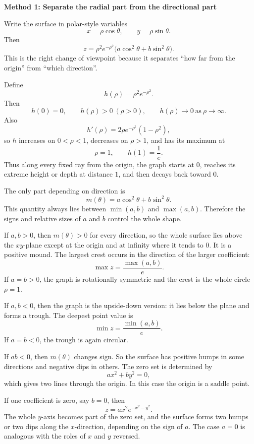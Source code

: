 \documentclass[a4paper,12pt,twocolumn]{article}
\newenvironment{solutionbox}{\begin{framed}}{\end{framed}}
\begin{document}
\begin{solutionbox}
\textbf{Method 1: Separate the radial part from the directional part}

\begin{steps}
\item Write the surface in polar-style variables
\[
x=\rho\cos\theta,\qquad y=\rho\sin\theta.
\]
Then
\[
z=\rho^2 e^{-\rho^2}\bigl(a\cos^2\theta+b\sin^2\theta\bigr).
\]
This is the right change of viewpoint because it separates ``how far from the origin'' from ``which direction''.

\item Define
\[
h(\rho)=\rho^2e^{-\rho^2}.
\]
Then
\[
h(0)=0,\qquad h(\rho)>0\ (\rho>0),\qquad h(\rho)\to 0\ \text{as}\ \rho\to\infty.
\]
Also
\[
h'(\rho)=2\rho e^{-\rho^2}(1-\rho^2),
\]
so \(h\) increases on \(0<\rho<1\), decreases on \(\rho>1\), and has its maximum at
\[
\rho=1,\qquad h(1)=\frac1e.
\]
Thus along every fixed ray from the origin, the graph starts at \(0\), reaches its extreme height or depth at distance \(1\), and then decays back toward \(0\).

\item The only part depending on direction is
\[
m(\theta)=a\cos^2\theta+b\sin^2\theta.
\]
This quantity always lies between \(\min(a,b)\) and \(\max(a,b)\). Therefore the signs and relative sizes of \(a\) and \(b\) control the whole shape.

\item If \(a,b>0\), then \(m(\theta)>0\) for every direction, so the whole surface lies above the \(xy\)-plane except at the origin and at infinity where it tends to \(0\). It is a positive mound. The largest crest occurs in the direction of the larger coefficient:
\[
\max z=\frac{\max(a,b)}{e}.
\]
If \(a=b>0\), the graph is rotationally symmetric and the crest is the whole circle \(\rho=1\).

\item If \(a,b<0\), then the graph is the upside-down version: it lies below the plane and forms a trough. The deepest point value is
\[
\min z=\frac{\min(a,b)}{e}.
\]
If \(a=b<0\), the trough is again circular.

\item If \(ab<0\), then \(m(\theta)\) changes sign. So the surface has positive humps in some directions and negative dips in others. The zero set is determined by
\[
ax^2+by^2=0,
\]
which gives two lines through the origin. In this case the origin is a saddle point.

\item If one coefficient is zero, say \(b=0\), then
\[
z=ax^2e^{-x^2-y^2}.
\]
The whole \(y\)-axis becomes part of the zero set, and the surface forms two humps or two dips along the \(x\)-direction, depending on the sign of \(a\). The case \(a=0\) is analogous with the roles of \(x\) and \(y\) reversed.
\end{steps}
\end{solutionbox}
\end{document}
